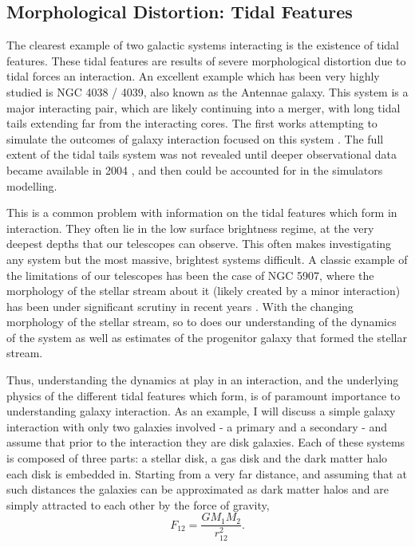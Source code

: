 \subsection{Morphological Distortion: Tidal Features}
\noindent The clearest example of two galactic systems interacting is the existence of tidal features. These tidal features are results of severe morphological distortion due to tidal forces an interaction. An excellent example which has been very highly studied is NGC 4038 / 4039, also known as the Antennae galaxy. This system is a major interacting pair, which are likely continuing into a merger, with long tidal tails extending far from the interacting cores. The first works attempting to simulate the outcomes of galaxy interaction focused on this system \citep{Works like TandT which looked at this}. The full extent of the tidal tails system was not revealed until deeper observational data became available in 2004 \citep{Citation from BandM}, and then could be accounted for in the simulators modelling.

This is a common problem with information on the tidal features which form in interaction. They often lie in the low surface brightness regime, at the very deepest depths that our telescopes can observe. This often makes investigating any system but the most massive, brightest systems difficult. A classic example of the limitations of our telescopes has been the case of NGC 5907, where the morphology of the stellar stream about it (likely created by a minor interaction) has been under significant scrutiny in recent years \citep{If this paragraph remains here, cite the different NGC 5907 papers}. With the changing morphology of the stellar stream, so to does our understanding of the dynamics of the system as well as estimates of the progenitor galaxy that formed the stellar stream. 

Thus, understanding the dynamics at play in an interaction, and the underlying physics of the different tidal features which form, is of paramount importance to understanding galaxy interaction. As an example, I will discuss a simple galaxy interaction with only two galaxies involved - a primary and a secondary - and assume that prior to the interaction they are disk galaxies. Each of these systems is composed of three parts: a stellar disk, a gas disk and the dark matter halo each disk is embedded in. Starting from a very far distance, and assuming that at such distances the galaxies can be approximated as dark matter halos and are simply attracted to each other by the force of gravity,
\begin{equation}
	F_{12} = \frac{GM_{1}M_{2}}{r_{12}^{2}}.
\end{equation}

